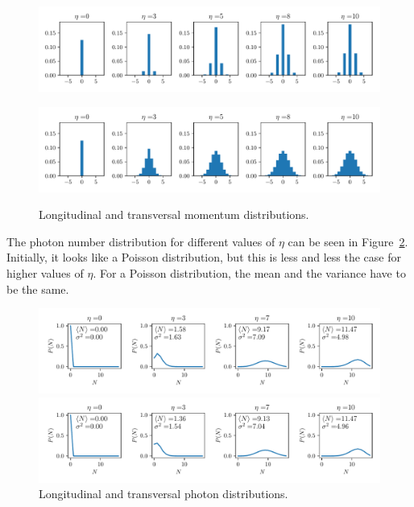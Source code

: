 \begin{figure}[!htb]
	\begin{minipage}[b]{1\linewidth}
	\centering
	\includegraphics[width=1\textwidth]{images/mom_long.pdf}
	\label{long_momentum}
	\end{minipage}
%
	\begin{minipage}[b]{1\linewidth}
	\centering
	\includegraphics[width=1\textwidth]{images/mom_trans.pdf}
	\label{trans_momentum}
	\end{minipage}
\caption{Longitudinal and transversal momentum distributions.}
\label{momenta}
\end{figure}
\FloatBarrier

\noindent The photon number distribution for different values of $\eta$ can be seen in Figure~\ref{photon_dist}. Initially, it looks like a Poisson distribution, but this is less and less the case for higher values of $\eta$. For a Poisson distribution, the mean and the variance have to be the same.

\begin{figure}[!htb]
	\begin{minipage}[b]{1\linewidth}
	\centering
	\includegraphics[width=1\textwidth]{images/pho_dens_long.pdf}
	\end{minipage}
%
	\begin{minipage}[b]{1\linewidth}
	\centering
	\includegraphics[width=1\textwidth]{images/pho_dens_trans.pdf}
	\end{minipage}
\caption{Longitudinal and transversal photon distributions.}
\label{photon_dist}
\end{figure}
\FloatBarrier

